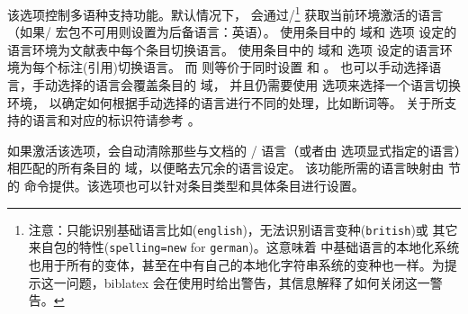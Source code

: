 \begin{optionlist}
该选项控制多语种支持功能。默认情况下，
\biblatex 会通过/\footnote{注意：\biblatex 只能识别基础语言比如(\eg \texttt{english})，无法识别语言变种(\eg \texttt{british})或
其它来自包的特性(\eg \texttt{spelling=new} for \texttt{german})。这意味着 \biblatex 中基础语言的本地化系统也用于所有的变体，甚至在中有自己的本地化字符串系统的变种也一样。为提示这一问题，biblatex 会在使用时给出警告，其信息解释了如何关闭这一警告。} 获取当前环境激活的语言
（如果/ 宏包不可用则设置为后备语言：英语）。
 使用条目中的  域和  选项
设定的语言环境为文献表中每个条目切换语言。
 使用条目中的  域和  选项
设定的语言环境为每个标注(引用)切换语言。
而  则等价于同时设置  和  。
也可以手动选择语言，手动选择的语言会覆盖条目的  域，
并且仍需要使用  选项来选择一个语言切换环境，
以确定如何根据手动选择的语言进行不同的处理，比如断词等。
关于所支持的语言和对应的标识符请参考 。




如果激活该选项，\biblatex 会自动清除那些与文档的 / 语言（或者由  选项显式指定的语言）相匹配的所有条目的  域，以便略去冗余的语言设定。
该功能所需的语言映射由  节的  命令提供。该选项也可以针对条目类型和具体条目进行设置。




\end{optionlist}
